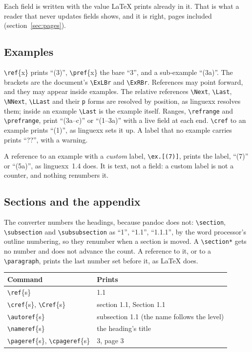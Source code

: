 \documentclass[11pt,a4paper]{article}
\newcommand{\cs}[1]{\texttt{\textbackslash #1}}
\newcommand{\pkg}[1]{\textsf{#1}}
\begin{document}
Each field is written with the value \LaTeX{} prints already in it. That is
what a reader that never updates fields shows, and it is right, pages
included (section~\ref{sec:pages}).

\subsection{Examples}\label{sec:xref-ex}

\cs{ref}\{x\} prints ``(3)'', \cs{pref}\{x\} the bare ``3'', and a
sub-example ``(3a)''. The brackets are the document's \cs{ExLBr} and
\cs{ExRBr}. References may point forward, and they may appear inside
examples. The relative references \cs{Next}, \cs{Last}, \cs{NNext},
\cs{LLast} and their \texttt{p} forms are resolved by position, as
\pkg{linguexx} resolves them; inside an example \cs{Last} is the example
itself. Ranges, \cs{refrange} and \cs{prefrange}, print ``(3a--c)'' or
``(1--3a)'' with a live field at each end. \cs{cref} to an example prints
``(1)'', as \pkg{linguexx} sets it up. A label that no example carries prints
``??'', with a warning.

A reference to an example with a \emph{custom} label, \cs{ex.[(7)]}, prints
the label, ``(7)'' or ``(5a)'', as \pkg{linguexx}~1.4 does. It is text, not a
field: a custom label is not a counter, and nothing renumbers it.

\subsection{Sections and the appendix}\label{sec:sections}

The converter numbers the headings, because pandoc does not: \cs{section},
\cs{subsection} and \cs{subsubsection} as ``1'', ``1.1'', ``1.1.1'', by the
word processor's outline numbering, so they renumber when a section is moved.
A \cs{section*} gets no number and does not advance the count. A reference to
it, or to a \cs{paragraph}, prints the last number set before it, as \LaTeX{}
does.

\begin{center}\small
\begin{tabular}{@{}l l@{}}
\toprule
\textbf{Command} & \textbf{Prints}\\
\midrule
\cs{ref}\{s\} & 1.1\\
\cs{cref}\{s\}, \cs{Cref}\{s\} & section 1.1, Section 1.1\\
\cs{autoref}\{s\} & subsection 1.1 (the name follows the level)\\
\cs{nameref}\{s\} & the heading's title\\
\cs{pageref}\{s\}, \cs{cpageref}\{s\} & 3, page 3\\
\bottomrule
\end{tabular}
\end{center}
\end{document}
